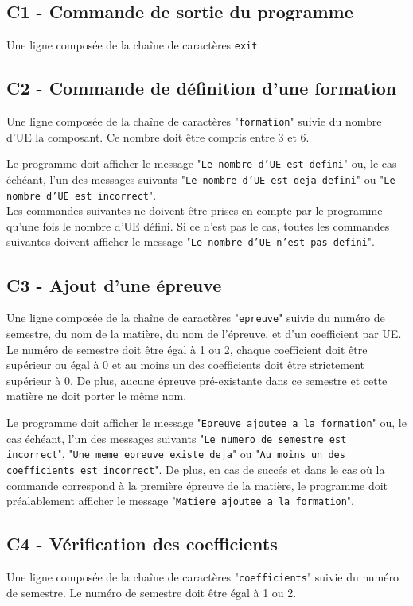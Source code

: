 \documentclass[10pt,a4paper,oneside]{article}
\begin{document}
\subsection*{C1 - Commande de sortie du programme}
Une ligne composée de la chaîne de caractères \texttt{exit}.

\subsection*{C2 - Commande de définition d'une formation}
Une ligne composée de la chaîne de caractères "\texttt{formation}" suivie du nombre d'UE la composant. Ce nombre doit être compris entre 3 et 6.

\medskip

Le programme doit afficher le message "\texttt{Le nombre d'UE est defini}" ou, le cas échéant, l'un des messages suivants "\texttt{Le nombre d'UE est deja defini}" ou "\texttt{Le nombre d'UE est incorrect}".
\\
Les commandes suivantes ne doivent être prises en compte par le programme qu'une fois le nombre d'UE défini. Si ce n'est pas le cas, toutes les commandes suivantes doivent afficher le message "\texttt{Le nombre d'UE n'est pas defini}".

\subsection*{C3 - Ajout d'une épreuve}
Une ligne composée de la chaîne de caractères "\texttt{epreuve}" suivie du numéro de semestre, du nom de la matière, du nom de l'épreuve, et d'un coefficient par UE. Le numéro de semestre doit être égal à 1 ou 2, chaque coefficient doit être supérieur ou égal à 0 et au moins un des coefficients doit être strictement supérieur à 0. De plus, aucune épreuve pré-existante dans ce semestre et cette matière ne doit porter le même nom.

\medskip

Le programme doit afficher le message "\texttt{Epreuve ajoutee a la formation}" ou, le cas échéant, l'un des messages suivants "\texttt{Le numero de semestre est incorrect}", "\texttt{Une meme epreuve existe deja}" ou "\texttt{Au moins un des \\coefficients est incorrect}". De plus, en cas de succés et dans le cas où la commande correspond à la première épreuve de la matière, le programme doit préalablement afficher le message "\texttt{Matiere ajoutee a la formation}".

\subsection*{C4 - Vérification des coefficients}
Une ligne composée de la chaîne de caractères "\texttt{coefficients}" suivie du numéro de semestre. Le numéro de semestre doit être égal à 1 ou 2.
\end{document}

